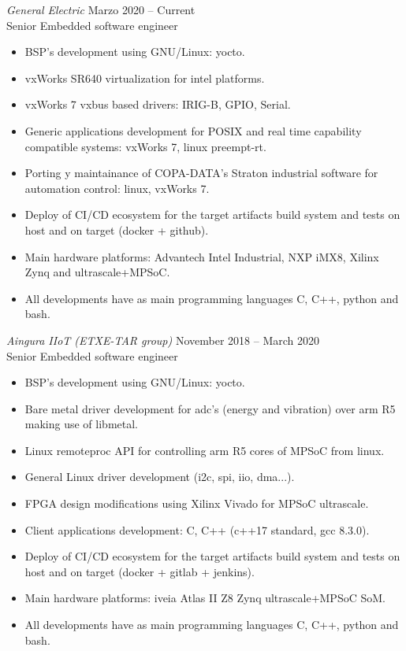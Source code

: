 \documentclass[10pt]{res} %
\begin{document}
\begin{resume}
{\sl General Electric} \hfill Marzo 2020 -- Current\\
\hfill Senior Embedded software engineer
\begin{itemize} \itemsep -2pt %
\item BSP's development using GNU/Linux: yocto.
\item vxWorks SR640 virtualization for intel platforms.
\item vxWorks 7 vxbus based drivers: IRIG-B, GPIO, Serial.
\item Generic applications development for POSIX and real time capability compatible systems: vxWorks 7, linux preempt-rt.
\item Porting y maintainance of COPA-DATA's Straton industrial software for automation control: linux, vxWorks 7.
\item Deploy of CI/CD ecosystem for the target artifacts build system and tests on host and on target (docker + github).
\item Main hardware platforms: Advantech Intel Industrial, NXP iMX8, Xilinx Zynq and ultrascale+MPSoC.
\item All developments have as main programming languages C, C++, python and bash.
\end{itemize}

{\sl Aingura IIoT (ETXE-TAR group)} \hfill November 2018 -- March 2020\\
\hfill Senior Embedded software engineer
\begin{itemize} \itemsep -2pt %
\item BSP's development using GNU/Linux: yocto.
\item Bare metal driver development for adc's (energy and vibration) over arm R5 making use of libmetal.
\item Linux remoteproc API for controlling arm R5 cores of MPSoC from linux.
\item General Linux driver development (i2c, spi, iio, dma...).
\item FPGA design modifications using Xilinx Vivado for MPSoC ultrascale.
\item Client applications development: C, C++ (c++17 standard, gcc 8.3.0).
\item Deploy of CI/CD ecosystem for the target artifacts build system and tests on host and on target (docker + gitlab + jenkins).
\item Main hardware platforms: iveia Atlas II Z8 Zynq ultrascale+MPSoC SoM.
\item All developments have as main programming languages C, C++, python and bash.
\end{itemize}


\end{resume}
\end{document}
